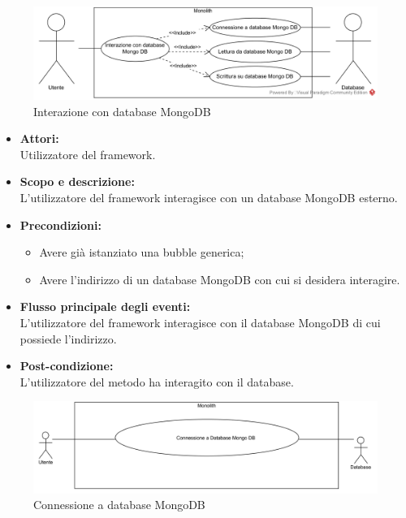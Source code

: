 
\begin{figure}[H]
	\centering
	\includegraphics[width=15cm]{../../documenti/AnalisiDeiRequisiti/Diagrammi_img/Database.png}
	\caption{\UCCaption{} Interazione con database MongoDB}
\end{figure}

\begin{itemize}
	\item \textbf{Attori:}
	\\Utilizzatore del framework.
	\item \textbf{Scopo e descrizione:} 
	\\L'utilizzatore del framework interagisce con un database MongoDB esterno.
	\item \textbf{Precondizioni:}
	\begin{itemize}
		\item Avere già istanziato una bubble generica;
		\item Avere l'indirizzo di un database MongoDB con cui si desidera interagire.
	\end{itemize}
	\item \textbf{Flusso principale degli eventi:}
	\\L'utilizzatore del framework interagisce con il database MongoDB di cui possiede l'indirizzo.
	\item \textbf{Post-condizione:}
	\\L'utilizzatore del metodo ha interagito con il database.
\end{itemize}


\begin{figure}[H]
	\centering
	\includegraphics[width=15cm]{../../documenti/AnalisiDeiRequisiti/Diagrammi_img/uc1_00.png}
	\caption{\UCCaption{} Connessione a database MongoDB}
\end{figure}

